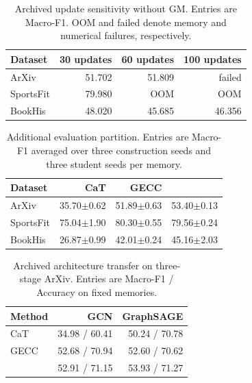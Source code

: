 \begin{table}[H]
\centering
\scriptsize
\setlength{\tabcolsep}{2.5pt}
\caption{Archived update sensitivity without GM. Entries are Macro-F1. OOM and
failed denote memory and numerical failures, respectively.}
\label{tab:compact_steps}
\begin{tabular*}{\linewidth}{@{\extracolsep{\fill}}lrrr@{}}
\toprule
Dataset & 30 updates & 60 updates & 100 updates\\
\midrule
ArXiv & 51.702 & 51.809 & failed\\
SportsFit & 79.980 & OOM & OOM\\
BookHis & 48.020 & 45.685 & 46.356\\
\bottomrule
\end{tabular*}
\end{table}

\begin{table}[H]
\centering
\scriptsize
\setlength{\tabcolsep}{2.5pt}
\caption{Additional evaluation partition. Entries are Macro-F1 averaged over
three construction seeds and three student seeds per memory.}
\label{tab:compact_partition}
\begin{tabular*}{\linewidth}{@{\extracolsep{\fill}}lrrr@{}}
\toprule
Dataset & CaT & GECC & \method{}\\
\midrule
ArXiv & 35.70$\pm$0.62 & 51.89$\pm$0.63 & 53.40$\pm$0.13\\
SportsFit & 75.04$\pm$1.90 & 80.30$\pm$0.55 & 79.56$\pm$0.24\\
BookHis & 26.87$\pm$0.99 & 42.01$\pm$0.24 & 45.16$\pm$2.03\\
\bottomrule
\end{tabular*}
\end{table}

\begin{table}[H]
\centering
\scriptsize
\setlength{\tabcolsep}{2.5pt}
\caption{Archived architecture transfer on three-stage ArXiv. Entries are
Macro-F1 / Accuracy on fixed memories.}
\label{tab:compact_architecture}
\begin{tabular*}{\linewidth}{@{\extracolsep{\fill}}lrr@{}}
\toprule
Method & GCN & GraphSAGE\\
\midrule
CaT & 34.98 / 60.41 & 50.24 / 70.78\\
GECC & 52.68 / 70.94 & 52.60 / 70.62\\
\method{} & 52.91 / 71.15 & 53.93 / 71.27\\
\bottomrule
\end{tabular*}
\end{table}

